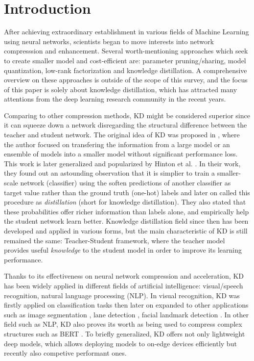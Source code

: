 \section{Introduction}

After achieving extraordinary establishment in various fields of Machine Learning using neural networks, scientists began to move interests into network compresssion and enhancement. Several worth-mentioning approaches which seek to create smaller model and cost-efficient are: parameter pruning/sharing, model quantization, low-rank factorization and knowledge distillation. A comprehensive overview on these approaches is outside of the scope of this survey, and the focus of this paper is solely about knowledge distillation, which has attracted many attentions from the deep learning research community in the recent years. 

Comparing to other compression methods, KD might be considered superior since it can squeeze down a network disregarding the structural difference between the teacher and student network. The original idea of KD was proposed in \cite{firstkdpaper}, where the author focused on transfering the information from a large model or an ensemble of models into a smaller model without significant performance loss. This work is later generalized and popularized by Hinton et al. \cite{hintonfirstkd}. In their work, they found out an astounding observation that it is simplier to train a smaller-scale network (classifier) using the soften predictions of another classifier as target value rather than the ground truth (one-hot) labels and later on called this procedure as \textit{distillation} (short for knowledge distillation). They also stated that these probabilities offer richer information than labels alone, and empirically help the student network learn better. Knowledge distillation field since then has been developed and applied in various forms, but the main characteristic of KD is still remained the same: Teacher-Student framework, where the teacher model provides useful \textit{knowledge} to the student model in order to improve its learning performance.

Thanks to its effectiveness on neural network compression and acceleration, KD has been widely applied in different fields of artificial intelligence: visual/speech recognition, natural language processing (NLP). In visual recognition, KD was firstly applied on classification tasks \cite{hintonfirstkd,visualtask01,visualtask02,visualtask03,visualtask04} then later on expanded to other applications such as image segmentation \cite{segment01}, lane detection \cite{lanedetect01}, facial landmark detection \cite{facial01, facial02}. In other field such as NLP, KD also proves its worth as being used to compress complex structures such as BERT \cite{nlp01, nlp02}. To briefly generalized, KD offers not only lightweight deep models, which allows deploying models to on-edge devices efficiently but recently also competive performant ones.

